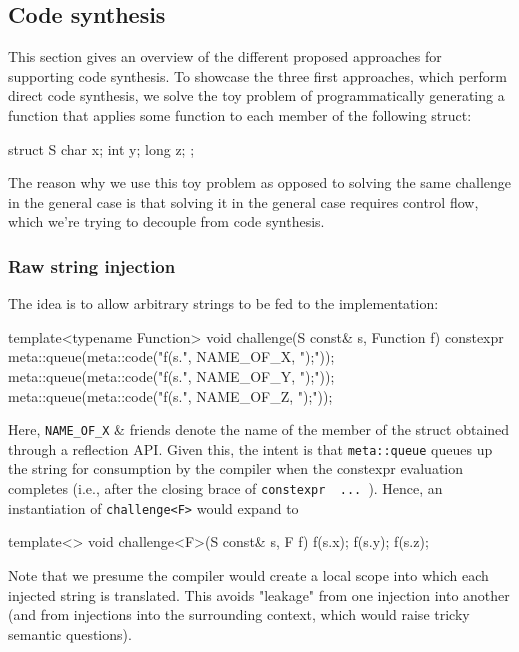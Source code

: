 \documentclass{wg21}
\newcommand{\cc}[1]{\texttt{#1}}
\begin{document}
\subsection{Code synthesis}
This section gives an overview of the different proposed approaches for
supporting code synthesis. To showcase the three first approaches, which
perform direct code synthesis, we solve the toy problem of programmatically
generating a function that applies some function to each member of the
following struct:

\begin{cpp}
struct S {
  char x;
  int y;
  long z;
};
\end{cpp}

The reason why we use this toy problem as opposed to solving the same challenge
in the general case is that solving it in the general case requires control flow,
which we're trying to decouple from code synthesis.

\subsubsection{Raw string injection}
The idea is to allow arbitrary strings to be fed to the implementation:

\begin{cpp}
template<typename Function>
void challenge(S const& s, Function f) {
  constexpr {
    meta::queue(meta::code("f(s.", NAME_OF_X, ");"));
    meta::queue(meta::code("f(s.", NAME_OF_Y, ");"));
    meta::queue(meta::code("f(s.", NAME_OF_Z, ");"));
  }
}
\end{cpp}

Here, \cc{NAME_OF_X} \& friends denote the name of the member of the struct
obtained through a reflection API. Given this, the intent is that \cc{meta::queue}
queues up the string for consumption by the compiler when the constexpr evaluation
completes (i.e., after the closing brace of \cc{constexpr { ... }}). Hence, an
instantiation of \cc{challenge<F>} would expand to

\begin{cpp}
template<>
void challenge<F>(S const& s, F f) {
  { f(s.x); }
  { f(s.y); }
  { f(s.z); }
}
\end{cpp}

Note that we presume the compiler would create a local scope into which each
injected string is translated. This avoids "leakage" from one injection into
another (and from injections into the surrounding context, which would raise
tricky semantic questions).
\end{document}
